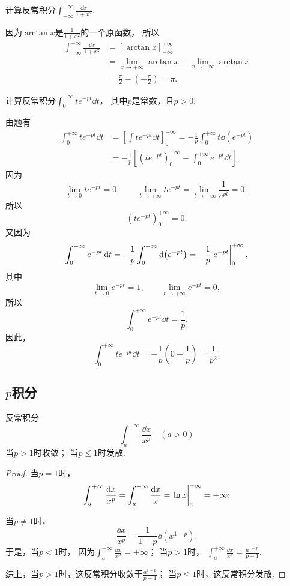 \begin{example}
计算反常积分\(\int_{-\infty}^{+\infty} \frac{\dd{x}}{1+x^2}\).
\begin{solution}
因为\(\arctan x\)是\(\frac{1}{1+x^2}\)的一个原函数，
所以\begin{align*}
	\int_{-\infty}^{+\infty} \frac{\dd{x}}{1+x^2}
	&= [\arctan x]_{-\infty}^{+\infty} \\
	&= \lim_{x\to+\infty} \arctan x
		-\lim_{x\to-\infty} \arctan x \\
	&= \frac{\pi}{2} - \left(-\frac{\pi}{2}\right)
	= \pi.
\end{align*}
\end{solution}
\end{example}

\begin{example}
计算反常积分\(\int_0^{+\infty} t e^{-pt} \dd{t}\)，
其中\(p\)是常数，且\(p>0\).
\begin{solution}
由题有\begin{align*}
	\int_0^{+\infty} t e^{-pt} \dd{t}
	&= \left[ \int t e^{-pt} \dd{t} \right]_0^{+\infty}
	= -\frac{1}{p} \int_0^{+\infty} t \dd(e^{-pt}) \\
	&= -\frac{1}{p} \left[
			\left( t e^{-pt} \right)_0^{+\infty}
			- \int_0^{+\infty} e^{-pt} \dd{t}
		\right].
\end{align*}
因为\[
	\lim_{t\to0} t e^{-pt} = 0, \qquad
	\lim_{t\to+\infty} t e^{-pt}
	= \lim_{t\to+\infty} \frac{1}{e^{pt}}
	= 0,
\]
所以\[
	\left( t e^{-pt} \right)_0^{+\infty}
	= 0.
\]
又因为\[
	\int_0^{+\infty} e^{-pt} \dd{t}
	= -\frac{1}{p} \int_0^{+\infty} \dd(e^{-pt})
	= -\frac{1}{p} \eval{e^{-pt}}_0^{+\infty},
\]
其中\[
	\lim_{t\to0} e^{-pt} = 1, \qquad
	\lim_{t\to+\infty} e^{-pt} = 0,
\]
所以\[
	\int_0^{+\infty} e^{-pt} \dd{t}
	= \frac{1}{p}.
\]
因此，\[
	\int_0^{+\infty} t e^{-pt} \dd{t}
	= -\frac{1}{p} \left(
			0 - \frac{1}{p}
		\right)
	= \frac{1}{p^2}.
\]
\end{solution}
\end{example}

\subsection{\texorpdfstring{\(p\)}{p}积分}
\begin{proposition}[\(p\)积分]\label{example:定积分.p积分}
反常积分\[
\int_a^{+\infty} \frac{\dd{x}}{x^p} \quad(a>0)
\]
当\(p > 1\)时收敛；
当\(p \leq 1\)时发散.
\begin{proof}
当\(p=1\)时，\[
	\int_a^{+\infty} \frac{\dd{x}}{x^p}
	= \int_a^{+\infty} \frac{\dd{x}}{x}
	= \eval{\ln x}_a^{+\infty}
	= +\infty;
\]

当\(p\neq1\)时，\[
	\frac{\dd{x}}{x^p}
	= \frac{1}{1-p} \dd(x^{1-p}).
\]
于是，当\(p<1\)时，
因为\(\int_a^{+\infty} \frac{\dd{x}}{x^p}
= +\infty\)；
当\(p>1\)时，
\(\int_a^{+\infty} \frac{\dd{x}}{x^p}
= \frac{a^{1-p}}{p-1}\).

综上，当\(p > 1\)时，这反常积分收敛于\(\frac{a^{1-p}}{p-1}\)；
当\(p\leq1\)时，这反常积分发散.
\end{proof}
\end{proposition}

